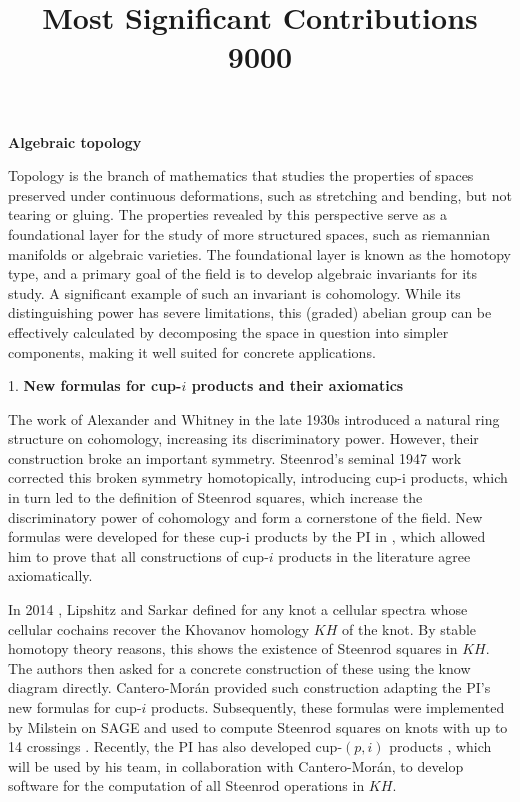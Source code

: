 \documentclass{amsart}
\title{Most Significant Contributions 9000}
\begin{document}
	\textbf{Algebraic topology}

	Topology is the branch of mathematics that studies the properties of spaces preserved under continuous deformations, such as stretching and bending, but not tearing or gluing. The properties revealed by this perspective serve as a foundational layer for the study of more structured spaces, such as riemannian manifolds or algebraic varieties. The foundational layer is known as the homotopy type, and a primary goal of the field is to develop algebraic invariants for its study. A significant example of such an invariant is cohomology. While its distinguishing power has severe limitations, this (graded) abelian group can be effectively calculated by decomposing the space in question into simpler components, making it well suited for concrete applications.

	1. \textbf{New formulas for cup-$i$ products and their axiomatics}

	The work of Alexander and Whitney in the late 1930s introduced a natural ring structure on cohomology, increasing its discriminatory power. However, their construction broke an important symmetry. Steenrod's seminal 1947 work \cite{steenrod1947products} corrected this broken symmetry homotopically, introducing cup-i products, which in turn led to the definition of Steenrod squares, which increase the discriminatory power of cohomology and form a cornerstone of the field. New formulas were developed for these cup-i products by the PI in \cite{medina2023fast_sq}, which allowed him to prove that all constructions of cup-$i$ products in the literature agree axiomatically.

	In 2014 \cite{lipshitz2014khovanov}, Lipshitz and Sarkar defined for any knot a cellular spectra whose cellular cochains recover the Khovanov homology $KH$ of the knot. By stable homotopy theory reasons, this shows the existence of Steenrod squares in $KH$. The authors then asked for a concrete construction of these using the know diagram directly. Cantero-Mor\'an \cite{cantero-moran2020khovanov} provided such construction adapting the PI's new formulas for cup-$i$ products. Subsequently, these formulas were implemented by Milstein on SAGE and used to compute Steenrod squares on knots with up to 14 crossings \cite{milstein2022khovanov}.
	Recently, the PI has also developed cup-$(p,i)$ products \cite{medina2021may_st}, which will be used by his team, in collaboration with Cantero-Mor\'an, to develop software for the computation of all Steenrod operations in $KH$.
\end{document}
